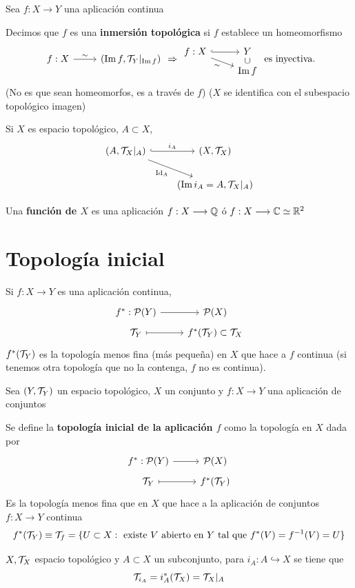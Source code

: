 Sea $f: X \longrightarrow Y$ una aplicaci\'on continua
\begin{defi}
    Decimos que $f$ es una \textbf{inmersión topológica} si $f$ establece un homeomorfismo 
    $$\bt f: X \rar{\sim} & (\Im f, \mc T_Y \vert{} _{\Im f}) \et \Rightarrow \bt f: X \arrow[swap]{rd}{\sim} \rar[hook] & Y \\[-5mm] & \Im f \arrow[phantom]{u}{\cup}  \et \text{ es inyectiva.}$$
    (No es que sean homeomorfos, es a trav\'es de $f$) ($X$ se identifica con el subespacio topol\'ogico imagen)
\end{defi}
\begin{ejem}
    Si $X$ es espacio topol\'ogico, $A \subset X$, 
    $$\bt (A, \mc T_X\vert{}_A) \arrow[swap]{rd}{\Id_A} \rar[hook]{i_A} & (X, \mc T_X) \\  & (\Im i_A = A, \mc T_X \vert{} _A) \et$$
\end{ejem}
\begin{defi}
    Una \textbf{función de $X$} es una aplicaci\'on $f: X\longrightarrow \mathbb{Q}$ \'o $f: X\longrightarrow \mathbb{C} \simeq \mathbb{R}^2$
\end{defi}

\section{Topolog\'ia inicial}
\begin{custom}
[Motivaci\'on] Si $f: X \longrightarrow Y$ es una aplicaci\'on continua, 
$$\bt f^* : \mc P(Y) \rar & \mc P(X) \\[-5mm] \mc T_Y \rarmaps & f^*(\mc T_Y) \subset \mc T_X \et$$
$f^*(\mathcal{T}_Y)$ es la topolog\'ia menos fina (m\'as pequeña) en $X$ que hace a $f$ continua (si tenemos otra topolog\'ia que no la contenga, $f$ no es continua). 
\end{custom}
Sea $(Y, \mathcal{T}_Y)$ un espacio topol\'ogico, $X$ un conjunto y $f:X \longrightarrow Y$ una aplicaci\'on de conjuntos
\begin{defi}
    Se define la \textbf{topología inicial de la aplicación $f$} como la topolog\'ia en $X$ dada por 
    $$\bt f^* : \mc P(Y) \rar & \mc P(X) \\[-5mm] \mc T_Y \rarmaps & f^*(\mc T_Y)  \et$$
    Es la topolog\'ia menos fina que en $X$ que hace a la aplicaci\'on de conjuntos $f: X\longrightarrow Y$ continua
    $$f^*(\mathcal{T}_Y) \equiv \mathcal{T}_f = \{U \subset X : \text{ existe } V \text{ abierto en } Y \text{ tal que } f^*(V) = f^{-1}(V) = U\}$$
\end{defi}\begin{ejem}
    $X, \mathcal{T}_X$ espacio topol\'ogico y $A \subset X$ un subconjunto, para $i_A: A \hookrightarrow X$ se tiene que 
    $$\mathcal{T}_{i_A} = i_A^*(\mathcal{T}_X) = \mathcal{T}_X\vert{}_A$$
\end{ejem}

